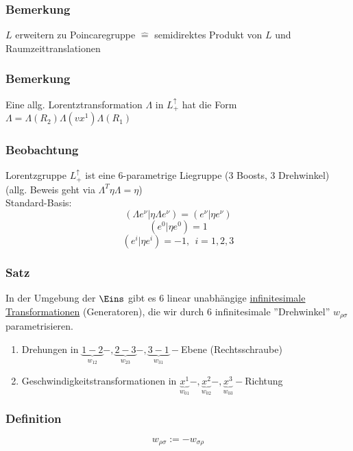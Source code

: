 \documentclass[twoside,a4paper]{scrartcl}
\renewcommand{\1}{\mathds{1}}
\newcommand{\entspricht}{\mathrel{\widehat{=}}}
\renewcommand{\L}{\Lambda}
\begin{document}
\subsubsection*{Bemerkung}
$L$ erweitern zu Poincaregruppe $\entspricht$ semidirektes Produkt von $L$ und Raumzeittranslationen
\subsubsection*{Bemerkung}
Eine allg. Lorentztransformation $\L$ in $L_+^\uparrow$ hat die Form $\L=\L(R_2)\L(v x^1)\L(R_1)$
\subsubsection*{Beobachtung}
Lorentzgruppe $L_+^\uparrow$ ist eine 6-parametrige Liegruppe (3 Boosts, 3 Drehwinkel)\\
(allg. Beweis geht via $\L^T \eta \L=\eta$)\\
Standard-Basis: 
$$(\L e^\nu | \eta \L e^\nu)=(e^\nu|\eta e^\nu)$$
$$(e^0 | \eta e^0)=1$$
$$(e^i | \eta e^i)=-1, \ \ i=1,2,3$$

\subsubsection*{Satz}
In der Umgebung der $\Eins$ gibt es 6 linear unabhängige \underline{infinitesimale Transformationen} (Generatoren), die wir durch 6 infinitesimale ''Drehwinkel'' $w_{\rho\sigma}$ parametrisieren.
\begin{enumerate}
\item Drehungen in $\underbrace{1-2}_{w_{12}}-,\underbrace{2-3}_{w_{23}}-,\underbrace{3-1}_{w_{31}}-$Ebene (Rechtsschraube)
\item Geschwindigkeitstransformationen in $\underbrace{x^1}_{w_{01}}-,\underbrace{x^2}_{w_{02}}-,\underbrace{x^3}_{w_{03}}-$Richtung
\end{enumerate}
\subsubsection*{Definition}
$$w_{\rho\sigma}:=-w_{\sigma\rho}$$
\end{document}
